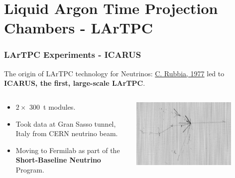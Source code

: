\documentclass[xcolor=dvipsnames]{beamer}
\begin{document}




\section {Liquid Argon Time Projection Chambers - LArTPC}


\begin{frame}
  \frametitle{LArTPC Experiments - ICARUS}

  The origin of LArTPC technology for Neutrinos: \href{http://cds.cern.ch/record/117852/files/CERN-EP-INT-77-8.pdf}{C. Rubbia, 1977} led to \textbf{ICARUS, the first, large-scale LArTPC}.

  \begin{columns}
    \begin{column}{0.5\textwidth}
      \begin{itemize}
      \item $2\times$ \SI{300}{\tonne} modules.
      \item Took data at Gran Sasso tunnel, Italy from CERN neutrino beam.
      \item Moving to Fermilab as part of the \textbf{Short-Baseline
        Neutrino} Program.
      \end{itemize}
    \end{column}
    \begin{column}{0.5\textwidth}
      \includegraphics[width=0.8\textwidth]{icarus.png}
    \end{column}
  \end{columns}
\end{frame}
\end{document}
